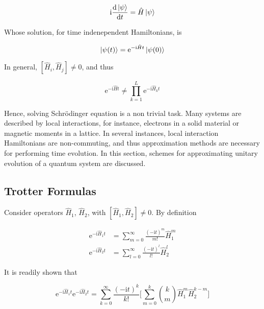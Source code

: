   \begin{equation}
    \mathrm{i}\dv{\ket{\psi}}{t} = \hat{H}\ket{\psi} 
    \label{eq:Schrodinger}
  \end{equation}

  Whose solution, for time indenependent Hamiltonians, is

  \begin{equation}
    \ket{\psi(t)} = \mathrm{e}^{-\mathrm{i}\hat{H}t}\ket{\psi(0)}
    \label{eq:schrodSolution}
  \end{equation}
  
  In general, $[\hat{H}_i,\hat{H}_j] \neq 0$, and thus

  \begin{equation}
    \mathrm{e}^{-\mathrm{i}\hat{H}t} \neq \prod_{k = 1}^{L} \mathrm{e}^{-\mathrm{i}\hat{H}_kt}
    \label{eq:CommuteUnit}
  \end{equation}

  Hence, solving Schrödinger equation is a non trivial task. Many systems are described by local interactions, for instance, electrons in a solid material or magnetic moments in a lattice. In several instances, local interaction Hamiltonians are non-commuting, and thus approximation methods are necessary for performing time evolution. In this section, schemes for approximating unitary evolution of a quantum system are discussed.

  \subsection{Trotter Formulas}

  Consider operators $\hat{H}_1$, $\hat{H}_2$, with $[\hat{H}_1,\hat{H}_2] \neq 0$. By definition

  \begin{align}
    \mathrm{e}^{-\mathrm{i}\hat{H}_1 t} & = \sum_{m = 0}^{\infty} \frac{(-\mathrm{i}t)^m}{m!}\hat{H}_1^m \\
    \mathrm{e}^{-\mathrm{i}\hat{H}_2 t} & = \sum_{l = 0}^{\infty} \frac{(-\mathrm{i}t)^l}{l!}\hat{H}_2^l
    \label{eq:ExpSeries}
  \end{align}

  It is readily shown that

  \begin{equation}
    \mathrm{e}^{-\mathrm{i}\hat{H}_1 t}\mathrm{e}^{-\mathrm{i}\hat{H}_2 t} = \sum_{k = 0}^{\infty} \frac{(-\mathrm{i}t)^k}{k!} \Bigg[\sum_{m = 0}^k \binom{k}{m} \hat{H}_1^m \hat{H}_2^{k-m}\Bigg]
    \label{eq:ExpProdExact}
  \end{equation}

